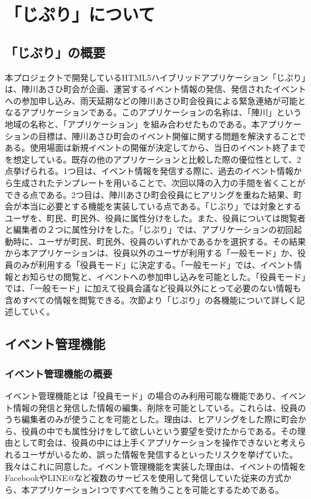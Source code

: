 \chapter{「じぷり」について}

\section{「じぷり」の概要}%
本プロジェクトで開発しているHTML5ハイブリッドアプリケーション「じぷり」は、陣川あさひ町会が企画、運営するイベント情報の発信、発信されたイベントへの参加申し込み、雨天延期などの陣川あさひ町会役員による緊急連絡が可能となるアプリケーションである。このアプリケーションの名称は、「陣川」という地域の名称と、「アプリケーション」を組み合わせたものである。本アプリケーションの目標は、陣川あさひ町会のイベント開催に関する問題を解決することである。使用場面は新規イベントの開催が決定してから、当日のイベント終了までを想定している。既存の他のアプリケーションと比較した際の優位性として、2点挙げられる。1つ目は、イベント情報を発信する際に、過去のイベント情報から生成されたテンプレートを用いることで、次回以降の入力の手間を省くことができる点である。2つ目は、陣川あさひ町会役員にヒアリングを重ねた結果、町会が本当に必要とする機能を実装している点である。「じぷり」では対象とするユーザを、町民、町民外、役員に属性分けをした。また、役員については閲覧者と編集者の２つに属性分けをした。「じぷり」では、アプリケーションの初回起動時に、ユーザが町民、町民外、役員のいずれかであるかを選択する。その結果から本アプリケーションは、役員以外のユーザが利用する「一般モード」か、役員のみが利用する「役員モード」に決定する。「一般モード」では、イベント情報とお知らせの閲覧と、イベントへの参加申し込みを可能とした。「役員モード」では、「一般モード」に加えて役員会議など役員以外にとって必要のない情報も含めすべての情報を閲覧できる。次節より「じぷり」の各機能について詳しく記述していく。

\section{イベント管理機能}%
\subsection{イベント管理機能の概要}%
イベント管理機能とは「役員モード」の場合のみ利用可能な機能であり、イベント情報の発信と発信した情報の編集、削除を可能としている。これらは、役員のうち編集者のみが使うことを可能とした。理由は、ヒアリングをした際に町会から、役員の中でも属性分けをして欲しいという要望を受けたからである。その理由として町会は、役員の中には上手くアプリケーションを操作できないと考えられるユーザがいるため、誤った情報を発信するといったリスクを挙げていた。我々はこれに同意した。イベント管理機能を実装した理由は、イベントの情報をFacebookやLINE@など複数のサービスを使用して発信していた従来の方式から、本アプリケーション1つですべてを賄うことを可能とするためである。

